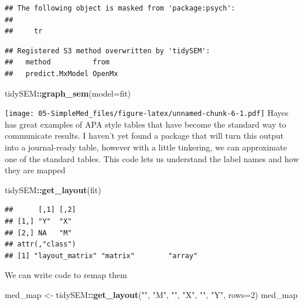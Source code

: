\documentclass[
  11pt,
]{book}
\newenvironment{Shaded}{\begin{snugshade}}{\end{snugshade}}
\newcommand{\AttributeTok}[1]{\textcolor[rgb]{0.27,0.27,0.27}{#1}}
\newcommand{\DecValTok}[1]{\textcolor[rgb]{0.06,0.06,0.06}{#1}}
\newcommand{\FunctionTok}[1]{\textcolor[rgb]{0.27,0.27,0.27}{\textbf{#1}}}
\newcommand{\NormalTok}[1]{#1}
\newcommand{\OtherTok}[1]{\textcolor[rgb]{0.37,0.37,0.37}{#1}}
\newcommand{\SpecialCharTok}[1]{\textcolor[rgb]{0.43,0.43,0.43}{\textbf{#1}}}
\newcommand{\StringTok}[1]{\textcolor[rgb]{0.5,0.5,0.5}{#1}}
\begin{document}
\begin{verbatim}
## The following object is masked from 'package:psych':
## 
##     tr
\end{verbatim}

\begin{verbatim}
## Registered S3 method overwritten by 'tidySEM':
##   method          from  
##   predict.MxModel OpenMx
\end{verbatim}

\begin{Shaded}
\begin{Highlighting}[]
\NormalTok{tidySEM}\SpecialCharTok{::}\FunctionTok{graph\_sem}\NormalTok{(}\AttributeTok{model=}\NormalTok{fit)}
\end{Highlighting}
\end{Shaded}

\texttt{[image: 05-SimpleMed\_files/figure-latex/unnamed-chunk-6-1.pdf]} Hayes has great examples of APA style tables that have become the standard way to communicate results. I haven't yet found a package that will turn this output into a journal-ready table, however with a little tinkering, we can approximate one of the standard tables. This code lets us understand the label names and how they are mapped

\begin{Shaded}
\begin{Highlighting}[]
\NormalTok{tidySEM}\SpecialCharTok{::}\FunctionTok{get\_layout}\NormalTok{(fit)}
\end{Highlighting}
\end{Shaded}

\begin{verbatim}
##      [,1] [,2]
## [1,] "Y"  "X" 
## [2,] NA   "M" 
## attr(,"class")
## [1] "layout_matrix" "matrix"        "array"
\end{verbatim}

We can write code to remap them

\begin{Shaded}
\begin{Highlighting}[]
\NormalTok{med\_map }\OtherTok{\textless{}{-}}\NormalTok{ tidySEM}\SpecialCharTok{::}\FunctionTok{get\_layout}\NormalTok{(}\StringTok{""}\NormalTok{, }\StringTok{"M"}\NormalTok{, }\StringTok{""}\NormalTok{,}
                               \StringTok{"X"}\NormalTok{, }\StringTok{""}\NormalTok{, }\StringTok{"Y"}\NormalTok{, }\AttributeTok{rows=}\DecValTok{2}\NormalTok{)}
\NormalTok{med\_map}
\end{Highlighting}
\end{Shaded}
\end{document}

